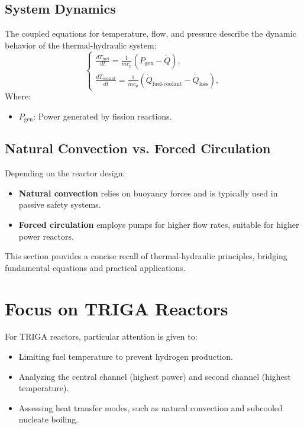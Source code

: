 \subsection{System Dynamics}
The coupled equations for temperature, flow, and pressure describe the dynamic behavior of the thermal-hydraulic system:
\[
\begin{cases}
\frac{dT_{\text{fuel}}}{dt} = \frac{1}{m c_p} \left( P_{\text{gen}} - \dot{Q} \right), \\[10pt]
\frac{dT_{\text{coolant}}}{dt} = \frac{1}{\dot{m} c_p} \left( \dot{Q}_{\text{fuel-coolant}} - \dot{Q}_{\text{loss}} \right),
\end{cases}
\]
Where:
\begin{itemize}
    \item \( P_{\text{gen}} \): Power generated by fission reactions.
\end{itemize}

\subsection{Natural Convection vs. Forced Circulation}
Depending on the reactor design:
\begin{itemize}
    \item \textbf{Natural convection} relies on buoyancy forces and is typically used in passive safety systems.
    \item \textbf{Forced circulation} employs pumps for higher flow rates, suitable for higher power reactors.
\end{itemize}

This section provides a concise recall of thermal-hydraulic principles, bridging fundamental equations and practical applications.

\section{Focus on TRIGA Reactors}

For TRIGA reactors, particular attention is given to:
\begin{itemize}
    \item Limiting fuel temperature to prevent hydrogen production.
    \item Analyzing the central channel (highest power) and second channel (highest temperature).
    \item Assessing heat transfer modes, such as natural convection and subcooled nucleate boiling.
\end{itemize}

